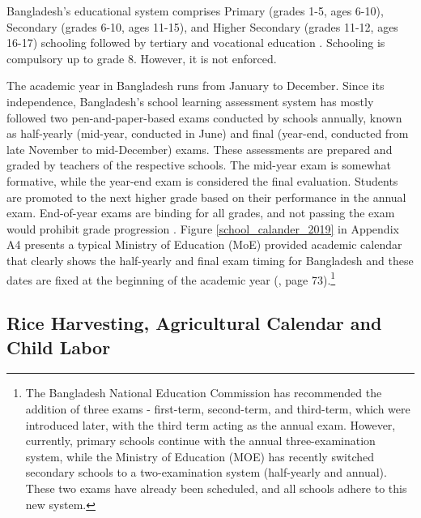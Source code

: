 \documentclass[12pt,letterpaper]{article}\usepackage[margin=1in]{geometry}
\newcommand{\0}{\ensuremath{\mbox{\boldmath $0$}}}
\begin{document}
Bangladesh's educational system comprises Primary (grades 1-5, ages 6-10), Secondary (grades 6-10, ages 11-15), and Higher Secondary (grades 11-12, ages 16-17) schooling followed by tertiary and vocational education \citep{kono2018primary}. Schooling is compulsory up to grade 8. However, it is not enforced. 

The academic year in Bangladesh runs from January to December. Since its independence, Bangladesh's school learning assessment system has mostly followed two pen-and-paper-based exams conducted by schools annually, known as half-yearly (mid-year, conducted in June) and final (year-end, conducted from late November to mid-December) exams. These assessments are prepared and graded by teachers of the respective schools. The mid-year exam is somewhat formative, while the year-end exam is considered the final evaluation. Students are promoted to the next higher grade based on their performance in the annual exam. End-of-year exams are binding for all grades, and not passing the exam would prohibit grade progression \citep{de2004school,begum2008school,ADB2017}. Figure \ref{school_calander_2019} in Appendix A4 presents a typical Ministry of Education (MoE) provided academic calendar that clearly shows the half-yearly and final exam timing for Bangladesh and these dates are fixed at the beginning of the academic year (\cite{ADB2017}, page 73).\footnote{The Bangladesh National Education Commission has recommended the addition of three exams - first-term, second-term, and third-term, which were introduced later, with the third term acting as the annual exam. However, currently, primary schools continue with the annual three-examination system, while the Ministry of Education (MOE) has recently switched secondary schools to a two-examination system (half-yearly and annual). These two exams have already been scheduled, and all schools adhere to this new system. } 


\subsection{Rice Harvesting, Agricultural Calendar and Child Labor \label{sec.rice}}
\end{document}
